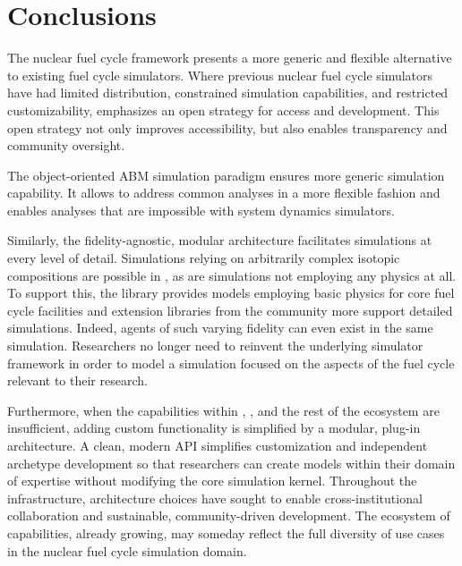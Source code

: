 

\section{Conclusions}


The \Cyclus nuclear fuel cycle framework presents a more generic and flexible
alternative to existing fuel cycle simulators. Where previous nuclear fuel
cycle simulators have had limited distribution, constrained simulation
capabilities, and restricted customizability, \Cyclus emphasizes an open
strategy for access and development.  This open strategy not only improves
accessibility, but also enables transparency and community oversight.

The object-oriented \gls{ABM} simulation paradigm ensures more generic
simulation capability. It allows \Cyclus to address common analyses in a more
flexible fashion and enables analyses that are impossible with system dynamics
simulators.

Similarly, the fidelity-agnostic, modular \Cyclus architecture facilitates simulations
at every level of detail. Simulations relying on arbitrarily complex isotopic
compositions are possible in \Cyclus, as are simulations not employing any
physics at all. To support this, the \Cycamore library provides models 
employing basic physics for core fuel cycle facilities and extension libraries 
from the community more support detailed simulations. Indeed, agents of such 
varying fidelity can even exist in the same simulation. Researchers no longer 
need to reinvent the underlying simulator framework in order to model a simulation 
focused on the aspects of the fuel cycle relevant to their research.

Furthermore, when the capabilities within \Cyclus, \Cycamore, and the rest of
the ecosystem are insufficient, adding custom functionality is simplified by a
modular, plug-in architecture. A clean, modern \gls{API} simplifies
customization and independent archetype development so that researchers can
create models within their domain of expertise without modifying the core
simulation kernel. Throughout the \Cyclus
infrastructure, architecture choices have sought to enable cross-institutional
collaboration and sustainable, community-driven development. The ecosystem
of capabilities, already growing, may someday reflect the full diversity of use
cases in the nuclear fuel cycle simulation domain.


